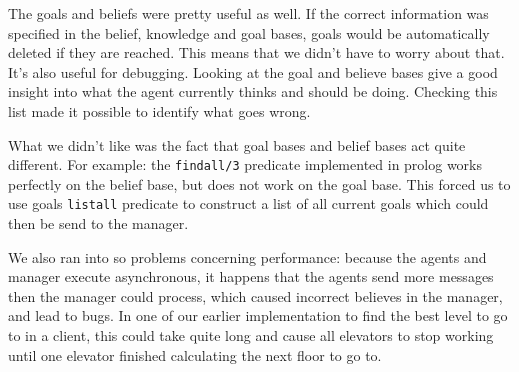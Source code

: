 \documentclass[a4paper,11pt,twocolumn]{article}
\begin{document}
The goals and beliefs were pretty useful as well. If the correct information was specified in the belief, knowledge and goal bases, goals would be automatically deleted if they are reached. This means that we didn't have to worry about that. It's also useful for debugging. Looking at the goal and believe bases give a good insight into what the agent currently thinks and should be doing. Checking this list made it possible to identify what goes wrong.  

What we didn't like was the fact that goal bases and belief bases act quite different. For example: the \texttt{findall/3} predicate implemented in prolog works perfectly on the belief base, but does not work on the goal base. This forced us to use goals \texttt{listall} predicate to construct a list of all current goals which could then be send to the manager. 

We also ran into so problems concerning performance: because the agents and manager execute asynchronous, it happens that the agents send more messages then the manager could process, which caused incorrect believes in the manager, and lead to bugs. In one of our earlier implementation to find the best level to go to in a client, this could take quite long and cause all elevators to stop working until one elevator finished calculating the next floor to go to.
\end{document}
